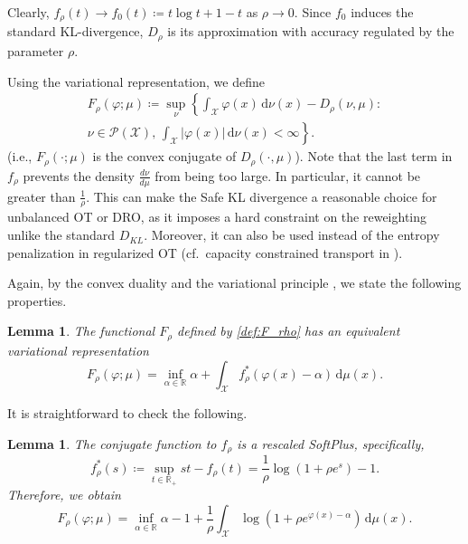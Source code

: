 \documentclass{article}
\newcommand{\dd}{\,\mathrm{d}}
\newcommand{\Pspace}{\mathcal{P}}
\newcommand{\R}{\mathbb{R}}
\newcommand*{\eqset}{\coloneqq}
\def\cX{\mathcal{X}}
\theoremstyle{plain}
\newtheorem{lemma}[theorem]{Lemma}
\theoremstyle{definition}
\theoremstyle{remark}
\begin{document}
Clearly, $f_\rho(t) \to f_0(t) \eqset t \log t + 1 - t$ as $\rho \to 0$.
Since $f_0$ induces the standard KL-divergence, $D_\rho$ is its approximation with accuracy regulated by the parameter $\rho$.


Using the variational representation, we define
\begin{multline}\label{def:F_rho}
    F_\rho(\varphi ; \mu) \eqset \sup_{\nu}\left\{\int_{\cX} \varphi(x) \dd \nu(x) - D_\rho(\nu, \mu) : \right. \\
    \left. \nu \in \Pspace(\cX),\, \int_{\cX} |\varphi(x)| \dd \nu(x) < \infty \right\} .
\end{multline}
(i.e., $F_\rho(\cdot ; \mu)$ is the convex conjugate of $D_\rho(\cdot, \mu)$).
Note that the last term in $f_\rho$ prevents the density $\frac{d \nu}{d \mu}$ from being too large. 
In particular, it cannot be greater than $\frac{1}{\rho}$. 
This can make the Safe KL divergence a reasonable choice for unbalanced OT or DRO, as it imposes a hard constraint on the reweighting unlike the standard $D_{KL}$.
Moreover, it can also be used instead of the entropy penalization in regularized OT (cf.\ capacity constrained transport in \citep[section~5.2]{benamou2015iterative}).

Again, by the convex duality and the variational principle \citep[see][Theorem~6]{birrell2022divergence}, we state the following properties.

\begin{lemma}
    The functional $F_\rho$ defined by \eqref{def:F_rho} has an equivalent variational representation
\begin{equation*}
    F_\rho(\varphi ; \mu) = \inf_{\alpha \in \R} \alpha + \int_{\cX} f_\rho^*(\varphi(x) - \alpha) \dd \mu(x) .  
\end{equation*}
\end{lemma}
It is straightforward to check the following. 

\begin{lemma}
    The conjugate function to $f_\rho$ is a rescaled SoftPlus, specifically,
    \begin{equation*}
        f_\rho^*(s) \eqset \sup_{t \in \R_+} s t - f_\rho(t) = \frac{1}{\rho} \log\left(1 + \rho e^s\right) - 1 .
    \end{equation*}
    Therefore, we obtain
    \begin{equation}\label{eq:F_rho_dual}
        F_\rho(\varphi ; \mu) = \inf_{\alpha \in \R} \alpha - 1 + \frac{1}{\rho} \int_{\cX} \log\left(1 + \rho e^{\varphi(x) - \alpha}\right) \dd \mu(x) .
    \end{equation}
\end{lemma}
\end{document}
